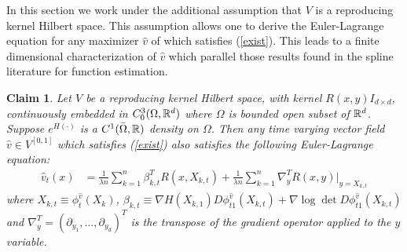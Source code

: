 \documentclass[noinfoline]{imsart}
\newtheorem{claim}{Claim}
\begin{document}
In this section we work under the additional assumption that $V$ is a reproducing kernel Hilbert space. This assumption allows one to derive the Euler-Lagrange equation for any maximizer $\hat v$ of which satisfies (\ref{exist}). This leads to a finite dimensional characterization of  $\hat v$  which  parallel those results found in the spline literature for function estimation.


\begin{claim}
\label{claim2}
Let $V$ be a  reproducing kernel Hilbert space, with  kernel $R(x,y)I_{d\times d}$, continuously  embedded in $C_0^3(\Omega, \Bbb R^d)$  where $\Omega$ is bounded open subset of $\Bbb R^d$. Suppose $e^{H(\cdot)}$ is a $C^1(\bar \Omega,\Bbb R)$ density  on $\Omega$. Then any time varying vector field $\hat v \in V^{[0,1]}$ which satisfies (\ref{exist}) also satisfies the following
 Euler-Lagrange equation:
 \begin{align}
 \label{ELeq}
 \hat v_t(x)&=  \frac{1}{\lambda n}\sum_{k=1}^n \beta^T_{k,t} R(x,X_{k,t})  +  \frac{1}{\lambda n}\sum_{k=1}^n   \nabla_{y}^T R(x,y)\Bigr|_{y= X_{k,t}}
\end{align}
where $X_{k,t}\equiv \phi_t^{\hat v} (X_k)$,
$ \beta_{k,t}\equiv   \nabla H(X_{k,1}) D\phi^{\hat v}_{t1}(X_{k,t})  +\nabla \log\det D\phi^{\hat v}_{t1} (X_{k,t})$ and $\nabla_y^T = (\partial_{y_1},\ldots, \partial_{y_d})^T$  is the transpose of the gradient operator applied to the $y$ variable.
\end{claim}
\end{document}
